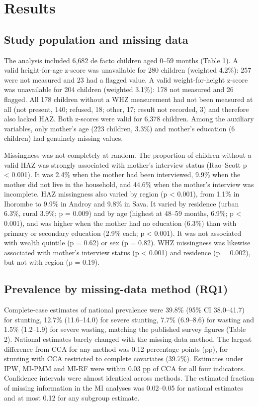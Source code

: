 \documentclass[11pt,a4paper]{article}
\begin{document}
\section{Results}\label{results}

\subsection{Study population and missing
data}\label{study-population-and-missing-data}

The analysis included 6,682 de facto children aged 0--59 months (Table
1). A valid height-for-age z-score was unavailable for 280 children
(weighted 4.2\%): 257 were not measured and 23 had a flagged value. A
valid weight-for-height z-score was unavailable for 204 children
(weighted 3.1\%): 178 not measured and 26 flagged. All 178 children
without a WHZ measurement had not been measured at all (not present,
140; refused, 18; other, 17; result not recorded, 3) and therefore also
lacked HAZ. Both z-scores were valid for 6,378 children. Among the
auxiliary variables, only mother's age (223 children, 3.3\%) and
mother's education (6 children) had genuinely missing values.

Missingness was not completely at random. The proportion of children
without a valid HAZ was strongly associated with mother's interview
status (Rao--Scott p \textless{} 0.001). It was 2.4\% when the mother
had been interviewed, 9.9\% when the mother did not live in the
household, and 44.6\% when the mother's interview was incomplete. HAZ
missingness also varied by region (p \textless{} 0.001), from 1.1\% in
Ihorombe to 9.9\% in Androy and 9.8\% in Sava. It varied by residence
(urban 6.3\%, rural 3.9\%; p = 0.009) and by age (highest at 48--59
months, 6.9\%; p \textless{} 0.001), and was higher when the mother had
no education (6.3\%) than with primary or secondary education (2.9\%
each; p \textless{} 0.001). It was not associated with wealth quintile
(p = 0.62) or sex (p = 0.82). WHZ missingness was likewise associated
with mother's interview status (p \textless{} 0.001) and residence (p =
0.002), but not with region (p = 0.19).

\subsection{Prevalence by missing-data method
(RQ1)}\label{prevalence-by-missing-data-method-rq1}

Complete-case estimates of national prevalence were 39.8\% (95\% CI
38.0--41.7) for stunting, 12.7\% (11.6--14.0) for severe stunting, 7.7\%
(6.9--8.6) for wasting and 1.5\% (1.2--1.9) for severe wasting, matching
the published survey figures (Table 2). National estimates barely
changed with the missing-data method. The largest difference from CCA
for any method was 0.12 percentage points (pp), for stunting with CCA
restricted to complete covariates (39.7\%). Estimates under IPW, MI-PMM
and MI-RF were within 0.03 pp of CCA for all four indicators. Confidence
intervals were almost identical across methods. The estimated fraction
of missing information in the MI analyses was 0.02--0.05 for national
estimates and at most 0.12 for any subgroup estimate.
\end{document}
